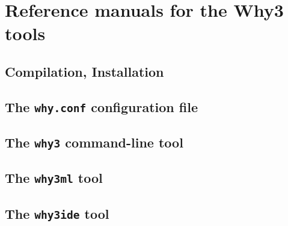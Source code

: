 \chapter{Reference manuals for the Why3 tools}

\section{Compilation, Installation}

\section{The \texttt{why.conf} configuration file}

\section{The \texttt{why3} command-line tool}

\section{The \texttt{why3ml} tool}

\section{The \texttt{why3ide} tool}


